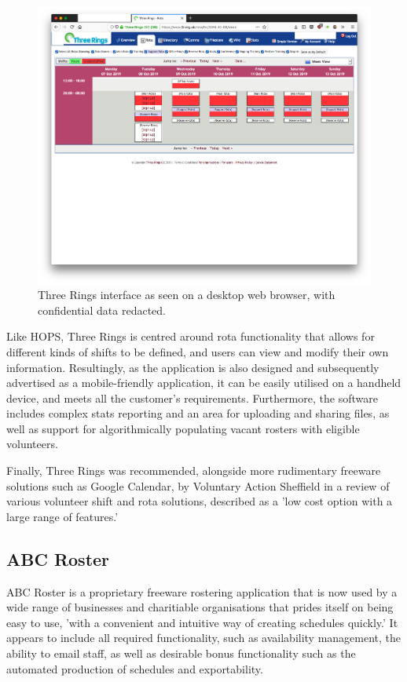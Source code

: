 \begin{figure}[!ht]
    \includegraphics[width=\textwidth]{Figures/3r}
    \caption{Three Rings interface as seen on a desktop web browser, with confidential data redacted.}
    \label{fig:3r}
\end{figure}

Like HOPS, Three Rings is centred around rota functionality that allows for different kinds of shifts to be defined, and users can view and modify their own information. Resultingly, as the application is also designed and subsequently advertised as a mobile-friendly application, it can be easily utilised on a handheld device, and meets all the customer's requirements. Furthermore, the software includes complex stats reporting and an area for uploading and sharing files, as well as support for algorithmically populating vacant rosters with eligible volunteers. \cite{3r3} \cite{3r2}

Finally, Three Rings was recommended, alongside more rudimentary freeware solutions such as Google Calendar, by Voluntary Action Sheffield in a review of various volunteer shift and rota solutions, described as a 'low cost option with a large range of features.' \cite{SVC1}

\subsection{ABC Roster} 

ABC Roster is a proprietary freeware rostering application that is now used by a wide range of businesses and charitiable organisations that prides itself on being easy to use, 'with a convenient and intuitive way of creating schedules quickly.' It appears to include all required functionality, such as availability management, the ability to email staff, as well as desirable bonus functionality such as the automated production of schedules and exportability. \cite{ABC1}

